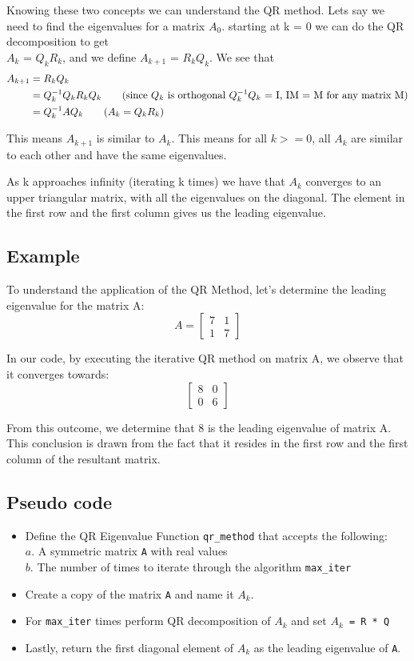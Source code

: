\documentclass[11pt]{article}
\begin{document}
Knowing these two concepts we can understand the QR method. Lets say we need to find the eigenvalues for a matrix $A_{0}$. starting at k = 0 we can do the QR decomposition to get\\
$A_{k}$ = $Q_{k}R_{k}$, and we define $A_{k+1}$ = $R_{k}Q_{k}$. 
We see that 
\begin{align*}
    A_{k+1} &= R_{k}Q_{k}\\
    & = Q_{k}^{-1}Q_{k}R_{k}Q_{k} \tag{since $Q_{k}$ is orthogonal $Q_{k}^{-1}Q_{k}$ = I, IM = M for any matrix M}\\
    & = Q_{k}^{-1}AQ_{k} \tag{$A_{k} = Q_{k}R_{k}$}
\end{align*}

This means $A_{k+1}$ is similar to $A_{k}$. This means for all $k>=0$, all $A_{k}$ are similar to each other and have the same eigenvalues. 

As k approaches infinity (iterating k times) we have that $A_{k}$ converges to an upper triangular matrix, with all the eigenvalues on the diagonal. The element in the first row and the first column gives us the leading eigenvalue. 

\subsection{Example}
To understand the application of the QR Method, let's determine the leading eigenvalue for the matrix A:
\[ A = \begin{bmatrix} 7 & 1 \\ 1 & 7 \end{bmatrix} \]

In our code, by executing the iterative QR method on matrix A, we observe that it converges towards:
\[ \begin{bmatrix} 8 & 0 \\ 0 & 6 \end{bmatrix} \]

From this outcome, we determine that 8 is the leading eigenvalue of matrix A. This conclusion is drawn from the fact that it resides in the first row and the first column of the resultant matrix.

\subsection{Pseudo code}
\begin{itemize}
    \item Define the QR Eigenvalue Function \texttt{qr\_method} that accepts the following:\\
    $a.$ A symmetric matrix \texttt{A} with real values\\
    $b.$ The number of times to iterate through the algorithm \texttt{max\_iter}
    \item Create a copy of the matrix \texttt{A} and name it \texttt{$A_k$}.
    \item For \texttt{max\_iter} times perform QR decomposition of \texttt{$A_k$} and set \texttt{$A_k$ = R * Q}
    \item Lastly, return the first diagonal element of \texttt{$A_k$} as the leading eigenvalue of \texttt{A}.
\end{itemize}
\end{document}
